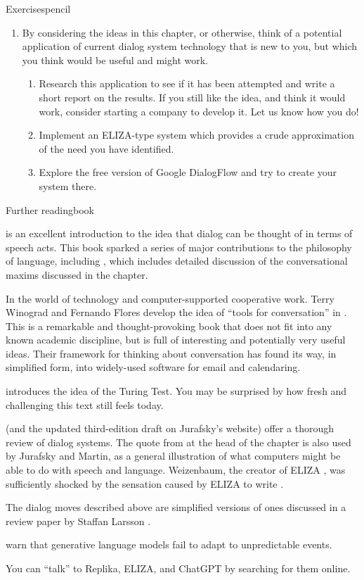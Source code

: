 \begin{tblsfilledsymbol}{Exercises}{pencil}
\begin{enumerate}
\item By considering the ideas in this chapter, or otherwise, think of a potential application of current dialog system technology that is new to you, but which you think would be useful and might work. 
  \begin{enumerate}
  \item Research this application to see if it has been attempted and write a short report on the results. If you still like the idea, and think it would work, consider starting a company to develop it. Let us know how you do!
  \item  Implement an ELIZA-type system which provides a crude approximation of the need you have identified.
  \item Explore the free version of Google DialogFlow and try to create your system there.
  \end{enumerate}

\end{enumerate}
\end{tblsfilledsymbol}


\begin{tblsfilledsymbol}{Further reading}{book}

\citet{austin:75} is an excellent introduction to the idea that dialog can be thought of in terms of speech acts. 
This book sparked a series of major contributions to the philosophy of language, including  \citet{grice:89}, which includes
detailed discussion of the conversational maxims discussed in the chapter.

In the world of technology and computer-supported cooperative work.
Terry Winograd and Fernando Flores develop the idea of ``tools for conversation'' in  \citet{WinogradFlores:1986}. This is a remarkable and thought-provoking book that does not fit into any known academic discipline, but is full of interesting and 
potentially very useful ideas.
Their framework for thinking about conversation has found its way, in simplified form, into widely-used software for email and calendaring. 

\citet{turing} introduces the idea of the Turing Test. You may be surprised by how fresh and challenging this text still feels today.

 \citet{Jurafsky.Martin-09} (and the updated third-edition draft on Jurafsky's website) offer a thorough review of dialog systems.  The quote from  at the head of the chapter is also used by Jurafsky and Martin, as a general illustration of what
computers might be able to do with speech and language.
Weizenbaum, the creator of ELIZA \citep{Weizenbaum:1966}, was sufficiently shocked by the sensation caused by ELIZA to write  \citet{weizenbaum:76}. 

The dialog moves described above are simplified versions of ones discussed in a review paper by Staffan Larsson \citep{Larsson}.

\citet{BenderKoller:2020} warn that generative language models fail to adapt to unpredictable events. 

You can ``talk'' to Replika, ELIZA, and ChatGPT by searching for them online. 

\end{tblsfilledsymbol}
